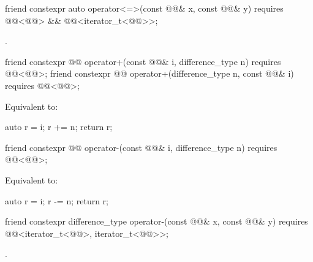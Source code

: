 \begin{itemdecl}
friend constexpr auto operator<=>(const @@& x, const @@& y)
  requires @@<@@> &&
           @@<iterator_t<@@>>;
\end{itemdecl}

\begin{itemdescr}
\pnum
\returns
{}.
\end{itemdescr}

\begin{itemdecl}
friend constexpr @@ operator+(const @@& i, difference_type n)
  requires @@<@@>;
friend constexpr @@ operator+(difference_type n, const @@& i)
  requires @@<@@>;
\end{itemdecl}

\begin{itemdescr}
\pnum
\effects
Equivalent to:
\begin{codeblock}
auto r = i;
r += n;
return r;
\end{codeblock}
\end{itemdescr}

\begin{itemdecl}
friend constexpr @@ operator-(const @@& i, difference_type n)
  requires @@<@@>;
\end{itemdecl}

\begin{itemdescr}
\pnum
\effects
Equivalent to:
\begin{codeblock}
auto r = i;
r -= n;
return r;
\end{codeblock}
\end{itemdescr}

\begin{itemdecl}
friend constexpr difference_type operator-(const @@& x, const @@& y)
  requires @@<iterator_t<@@>, iterator_t<@@>>;
\end{itemdecl}

\begin{itemdescr}
\pnum
\returns
{}.
\end{itemdescr}


